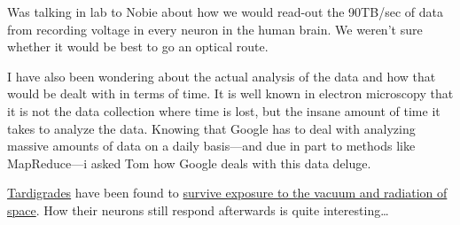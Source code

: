 Was talking in lab to Nobie about how we would read-out the 90TB/sec of
data from recording voltage in every neuron in the human brain. We
weren't sure whether it would be best to go an optical route.

I have also been wondering about the actual analysis of the data and how
that would be dealt with in terms of time. It is well known in electron
microscopy that it is not the data collection where time is lost, but
the insane amount of time it takes to analyze the data. Knowing that
Google has to deal with analyzing massive amounts of data on a daily
basis---and due in part to methods like MapReduce---i asked Tom how
Google deals with this data deluge.

\href{http://tardigradesinspace.blogspot.com/}{Tardigrades} have been
found to \href{URL}{survive exposure to the vacuum and radiation of
space}. How their neurons still respond afterwards is quite
interesting\ldots{}
